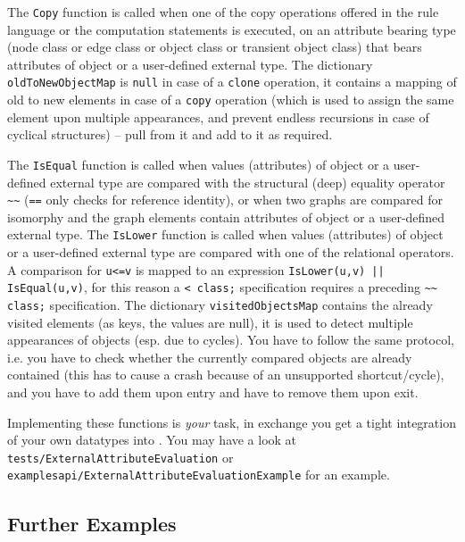 The \texttt{Copy} function is called when one of the copy operations offered in the rule language or the computation statements is executed, on an attribute bearing type (node class or edge class or object class or transient object class) that bears attributes of object or a user-defined external type. The dictionary \texttt{oldToNewObjectMap} is \texttt{null} in case of a \texttt{clone} operation, it contains a mapping of old to new elements in case of a \texttt{copy} operation (which is used to assign the same element upon multiple appearances, and prevent endless recursions in case of cyclical structures) -- pull from it and add to it as required.

The \texttt{IsEqual} function is called when values (attributes) of object or a user-defined external type are compared with the structural (deep) equality operator \texttt{\textasciitilde\textasciitilde} (\texttt{==} only checks for reference identity),
or when two graphs are compared for isomorphy and the graph elements contain attributes of object or a user-defined external type.
The \texttt{IsLower} function is called when values (attributes) of object or a user-defined external type are compared with one of the relational operators.
A comparison for \texttt{u<=v} is mapped to an expression \verb#IsLower(u,v) || IsEqual(u,v)#, for this reason a \verb#< class;# specification requires a preceding \verb#~~ class;# specification.
The dictionary \texttt{visitedObjectsMap} contains the already visited elements (as keys, the values are null), it is used to detect multiple appearances of objects (esp. due to cycles).
You have to follow the same protocol, i.e. you have to check whether the currently compared objects are already contained (this has to cause a crash because of an unsupported shortcut/cycle), and you have to add them upon entry and have to remove them upon exit.

Implementing these functions is \emph{your} task, in exchange you get a tight integration of your own datatypes into \GrG.
You may have a look at \texttt{tests/External\-Attribute\-Evaluation} or \texttt{examples\-api/External\-Attribute\-Evaluation\-Example} for an example.

\subsection*{Further Examples}

